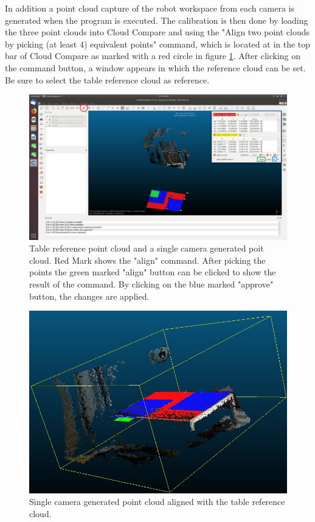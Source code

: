 In addition a point cloud capture of the robot workspace from each camera is generated when the program is executed. The calibration is then done by loading the three point clouds into Cloud Compare and using the "Align two point clouds by picking (at least 4) equivalent points" command, which is located at in the top bar of Cloud Compare as marked with a red circle in figure \ref{fig:showpoints}. After clicking on the command button, a window appears in which the reference cloud can be set. Be sure to select the table reference cloud as reference.

\begin{figure}[H]                                      
	\centering\includegraphics[scale=0.28]{images/CC_show_points.jpeg}			
	\caption{Table reference point cloud and a single camera generated poit cloud. Red Mark shows the "align" command. After picking the points the green marked "align" button can be clicked to show the result of the command. By clicking on the blue marked "approve" button, the changes are applied.}
	\label{fig:showpoints}                      
\end{figure}

\begin{figure}[H]                                      
	\centering\includegraphics[scale=0.5]{images/CC_aligned_cloud.jpeg}			
	\caption{Single camera generated point cloud aligned with the table reference cloud.}
	\label{fig:cloudaligned}                      
\end{figure}

